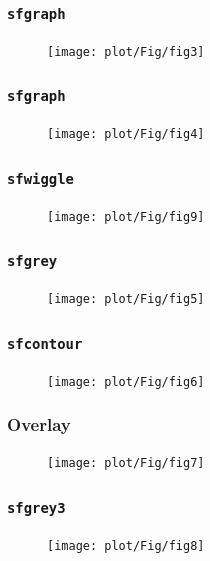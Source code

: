 \begin{frame}
  \frametitle{\texttt{sfgraph}}
  
  \begin{figure}
    \texttt{[image: plot/Fig/fig3]}
  \end{figure}
\end{frame}

\begin{frame}
  \frametitle{\texttt{sfgraph}}
  
  \begin{figure}
    \texttt{[image: plot/Fig/fig4]}
  \end{figure}
\end{frame}

\begin{frame}
  \frametitle{\texttt{sfwiggle}}
  
  \begin{figure}
    \texttt{[image: plot/Fig/fig9]}
  \end{figure}
\end{frame}

\begin{frame}
  \frametitle{\texttt{sfgrey}}
  
  \begin{figure}
    \texttt{[image: plot/Fig/fig5]}
  \end{figure}
\end{frame}

\begin{frame}
  \frametitle{\texttt{sfcontour}}
  
  \begin{figure}
    \texttt{[image: plot/Fig/fig6]}
  \end{figure}
\end{frame}

\begin{frame}
  \frametitle{Overlay}
  
  \begin{figure}
    \texttt{[image: plot/Fig/fig7]}
  \end{figure}
\end{frame}

\begin{frame}
  \frametitle{\texttt{sfgrey3}}
  
  \begin{figure}
    \texttt{[image: plot/Fig/fig8]}
  \end{figure}
\end{frame}

